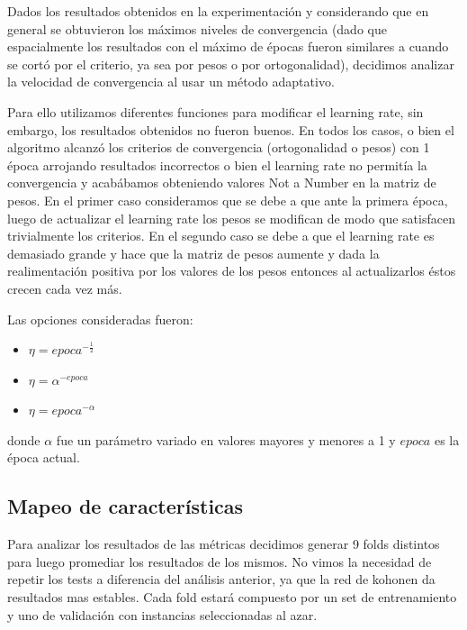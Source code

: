 \documentclass[informe.tex]{subfiles}
\begin{document}
 
 
      Dados los resultados obtenidos en la experimentación y considerando que en general se obtuvieron los m\'aximos niveles de convergencia (dado que espacialmente los resultados con el m\'aximo de \'epocas fueron similares a cuando se cort\'o por el criterio, ya sea por pesos o por ortogonalidad), decidimos analizar la velocidad de convergencia al usar un m\'etodo adaptativo. 
 
      Para ello utilizamos diferentes funciones para modificar el learning rate, sin embargo, los resultados obtenidos no fueron buenos. En todos los casos, o bien el algoritmo alcanzó los criterios de convergencia (ortogonalidad o pesos) con 1 \'epoca arrojando resultados incorrectos o bien el learning rate no permit\'ia la convergencia y acab\'abamos obteniendo valores Not a Number en la matriz de pesos. En el primer caso consideramos que se debe a que ante la primera época, luego de actualizar el learning rate los pesos se modifican de modo que satisfacen trivialmente los criterios. En el segundo caso se debe a que el learning rate es demasiado grande y hace que la matriz de pesos aumente y dada la realimentación positiva por los valores de los pesos entonces al actualizarlos éstos crecen cada vez más.
      
      Las opciones consideradas fueron:
      
      \begin{itemize}
	\item $\eta = epoca ^ {-\frac{1}{2}}$
	\item $\eta = \alpha ^ {-epoca}$
	\item $\eta = epoca ^ {-\alpha}$
      \end{itemize}
      
      donde $\alpha$ fue un parámetro variado en valores mayores y menores a 1 y $epoca$ es la época actual.

 
    \newpage
    \subsection{Mapeo de características}
    
      Para analizar los resultados de las m\'etricas decidimos generar 9 folds distintos para luego promediar los resultados de los mismos. No vimos la necesidad de repetir los tests a diferencia del an\'alisis anterior, ya que la red de kohonen da resultados mas estables. Cada fold estar\'a compuesto por un set de entrenamiento y uno de validaci\'on con instancias seleccionadas al azar.
    
\end{document}
